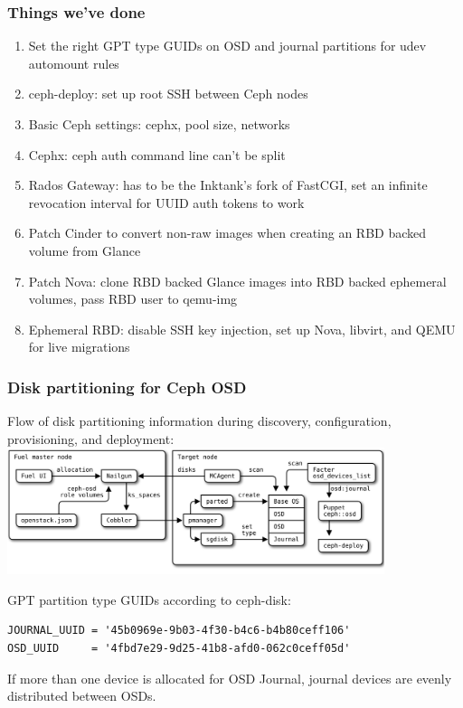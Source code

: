 \documentclass[hyperref=unicode,utf8,xcolor=pst]{beamer}
\begin{document}
\begin{frame}
	\frametitle{Things we've done}
	\begin{enumerate}
		\item Set the right GPT type GUIDs on OSD and journal
			partitions for udev automount rules
		\item ceph-deploy: set up root SSH between Ceph nodes
		\item Basic Ceph settings: cephx, pool size, networks
		\item Cephx: ceph auth command line can't be split
		\item Rados Gateway: has to be the Inktank's fork of
			FastCGI, set an infinite revocation interval for
			UUID auth tokens to work
		\item Patch Cinder to convert non-raw images when
			creating an RBD backed volume from Glance
		\item Patch Nova: clone RBD backed Glance images into
			RBD backed ephemeral volumes, pass RBD user to
			qemu-img
		\item Ephemeral RBD: disable SSH key injection, set up
			Nova, libvirt, and QEMU for live migrations
	\end{enumerate}
\end{frame}

\begin{frame}[fragile]
	\frametitle{Disk partitioning for Ceph OSD}
	Flow of disk partitioning information during discovery,
	configuration, provisioning, and deployment:\\
	\vspace{1ex}
	\includegraphics[height=3.7cm]{osd-disks}

	GPT partition type GUIDs according to ceph-disk:
	\begin{lstlisting}
JOURNAL_UUID = '45b0969e-9b03-4f30-b4c6-b4b80ceff106'
OSD_UUID     = '4fbd7e29-9d25-41b8-afd0-062c0ceff05d'
	\end{lstlisting}

	\vspace{1ex}
	If more than one device is allocated for OSD Journal, journal
	devices are evenly distributed between OSDs.
\end{frame}
\end{document}
